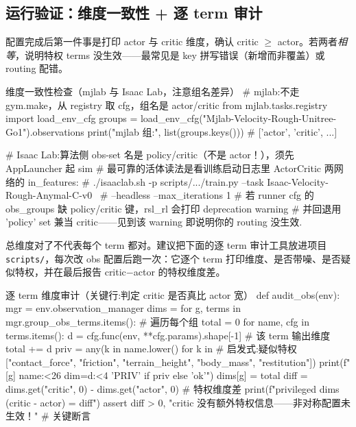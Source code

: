 \subsection{运行验证：维度一致性 + 逐 term 审计}
\label{sec:rlmc-priv-verify}

配置完成后第一件事是打印 actor 与 critic 维度，确认 critic $\ge$ actor。若两者\emph{相等}，说明特权 terms 没生效——最常见是 key 拼写错误（新增而非覆盖）或 routing 配错。

\begin{codebox}[Python]{维度一致性检查（mjlab 与 Isaac Lab，注意组名差异）}
# mjlab:不走 gym.make，从 registry 取 cfg，组名是 actor/critic
from mjlab.tasks.registry import load_env_cfg
groups = load_env_cfg("Mjlab-Velocity-Rough-Unitree-Go1").observations
print("mjlab 组:", list(groups.keys()))   # ['actor', 'critic', ...]

# Isaac Lab:算法侧 obs-set 名是 policy/critic（不是 actor！），须先 AppLauncher 起 sim
# 最可靠的活体读法是看训练启动日志里 ActorCritic 两网络的 in_features:
#   ./isaaclab.sh -p scripts/.../train.py --task Isaac-Velocity-Rough-Anymal-C-v0 \
#       --headless --max_iterations 1
# 若 runner cfg 的 obs_groups 缺 policy/critic 键，rsl_rl 会打印 deprecation warning
# 并回退用 'policy' set 兼当 critic——见到该 warning 即说明你的 routing 没生效.
\end{codebox}

总维度对了不代表每个 term 都对。建议把下面的逐 term 审计工具放进项目 \verb|scripts/|，每次改 obs 配置后跑一次：它逐个 term 打印维度、是否带噪、是否疑似特权，并在最后报告 critic$-$actor 的特权维度差。

\begin{codebox}[Python]{逐 term 维度审计（关键行:判定 critic 是否真比 actor 宽）}
def audit_obs(env):
    mgr = env.observation_manager
    dims = {}
    for g, terms in mgr.group_obs_terms.items():        # 遍历每个组
        total = 0
        for name, cfg in terms.items():
            d = cfg.func(env, **cfg.params).shape[-1]    # 该 term 输出维度
            total += d
            priv = any(k in name.lower() for k in        # 启发式:疑似特权
                       ["contact_force", "friction", "terrain_height",
                        "body_mass", "restitution"])
            print(f"[{g}] {name:<26} dim={d:<4} {'PRIV' if priv else 'ok'}")
        dims[g] = total
    diff = dims.get("critic", 0) - dims.get("actor", 0)  # 特权维度差
    print(f"privileged dims (critic - actor) = {diff}")
    assert diff > 0, "critic 没有额外特权信息——非对称配置未生效！"  # 关键断言
\end{codebox}

